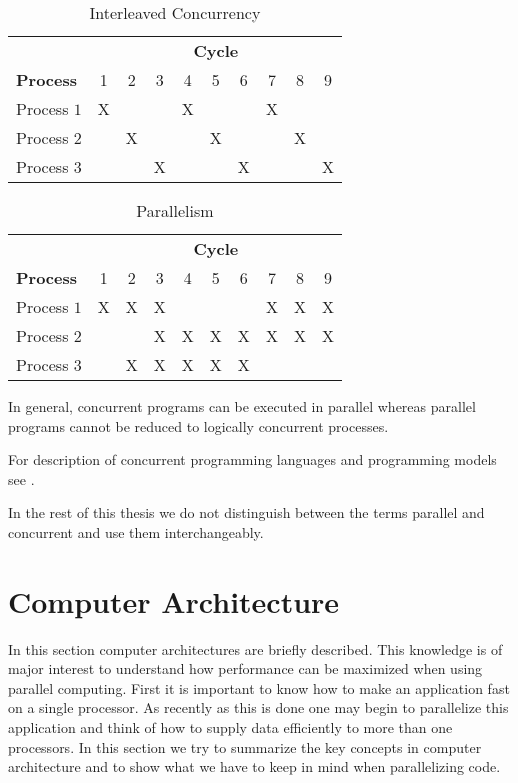 \begin{table}[h!b!p!]
\caption{Interleaved Concurrency}
\centering
\begin{tabular}{|l|c|c|c|c|c|c|c|c|c|}
\hline
 & \multicolumn{9}{|c|}{\textbf{Cycle}} \\
\textbf{Process}
	& 1
	& 2
	& 3
        & 4
        & 5
        & 6
        & 7
        & 8
        & 9
        \\ \hline 
Process $1$ & X &   &   & X &   &   & X &   &   \\ \hline
Process $2$ &   & X &   &   & X &   &   & X &   \\ \hline
Process $3$ &   &   & X &   &   & X &   &   & X \\ \hline
\end{tabular}
\label{tab:concurrency}
\end{table}

\begin{table}[h!b!p!]
\caption{Parallelism}
\centering
\begin{tabular}{|l|c|c|c|c|c|c|c|c|c|}
\hline
 & \multicolumn{9}{|c|}{\textbf{Cycle}} \\
\textbf{Process}
	& 1
	& 2
	& 3
        & 4
        & 5
        & 6
        & 7
        & 8
        & 9
        \\ \hline 
Process $1$ & X & X & X &   &   &   & X & X & X \\ \hline
Process $2$ &   &   & X & X & X & X & X & X & X \\ \hline
Process $3$ &   & X & X & X & X & X &   &   &   \\ \hline
\end{tabular}
\label{tab:parallelism}
\end{table}

In general, concurrent programs can be executed 
in parallel whereas parallel programs cannot be reduced to logically
concurrent processes. 

For description of concurrent programming languages and programming
models see \cite{gehani88:concurrentprog}.

In the rest of this thesis we do not distinguish between the terms
parallel and concurrent and use them interchangeably.

\section{Computer Architecture}

In this section computer architectures are briefly described. This
knowledge is of major interest to
understand how performance can be maximized when using parallel
computing. First it is important to know how to make an application fast
on a single processor. As recently as this is done one may begin to
parallelize this application and think of how to supply data efficiently to
more than one processors. In this section we try to summarize the key
concepts in computer architecture and to show what we have to keep in
mind when parallelizing code.

